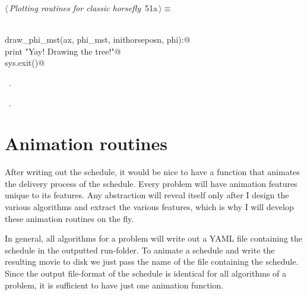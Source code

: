 \documentclass[11.5pt]{report}
\begin{document}
\vspace{-0.8cm} \newchunk 

\begin{flushleft} \small\label{scrap81}\raggedright\small
{} $\langle\,${\itshape Plotting routines for classic horsefly}\nobreak\ {\footnotesize {51a}}$\,\rangle\equiv$
\vspace{-1ex}
\begin{list}{}{} \item
\mbox{}\verb@@\\
\mbox{}\verb@def draw_phi_mst(ax, phi_mst, inithorseposn, phi):@\\
\mbox{}\verb@     print "Yay! Drawing the tree!"@\\
\mbox{}\verb@     sys.exit()@\\
\mbox{}\verb@@{\NWsep}
\end{list}
\vspace{-1.5ex}
\footnotesize
\begin{list}{}{\setlength{\itemsep}{-\parsep}\setlength{\itemindent}{-\leftmargin}}
\item \NWtxtMacroDefBy\ .
\item \NWtxtMacroRefIn\ .

\item{}
\end{list}
\vspace{4ex}
\end{flushleft}

\needspace{7cm}
\section{Animation routines}

\newchunk 
After writing out the schedule, it would be nice to have a function that animates the 
delivery process of the schedule. Every problem will have animation features unique to
its features. Any abstraction will reveal itself only after I design the various
algorithms and extract the various features, which is why I will develop these animation
routines on the fly. 

In general, all algorithms for a problem will write out a YAML file containing the schedule 
in the outputted run-folder. To animate a schedule and write the resulting movie to disk
we just pass the name of the file containing the schedule. Since the output file-format
of the schedule is identical for all algorithms of a problem, it is sufficient to have
just one animation function. 
\end{document}
